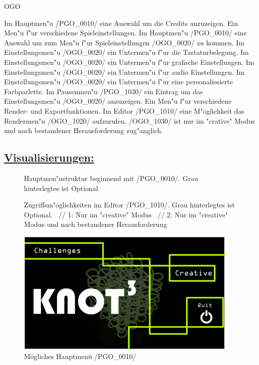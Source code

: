 \begin{ids}{\gls{OGO}}

	\id[0010] Im Hauptmen{"u} /PGO_0010/ eine Auswahl um die Credits anzuzeigen.
	\id[0020] Ein Men{"u} f{"u}r verschiedene Spieleinstellungen.
	\id[0030] Im Hauptmen{"u} /PGO_0010/ eine Auswahl um zum Men{"u} f{"u}r Spieleinstellungen /OGO_0020/ zu kommen.
	\id[0040] Im Einstellungsmen{"u} /OGO_0020/ ein Untermen{"u} f{"u}r die Tastaturbelegung.
	\id[0050] Im Einstellungsmen{"u} /OGO_0020/ ein Untermen{"u} f{"u}r grafische Einstellungen.
	\id[0060] Im Einstellungsmen{"u} /OGO_0020/ ein Untermen{"u} f{"u}r audio Einstellungen.
	\id[0070] Im Einstellungsmen{"u} /OGO_0020/ ein Untermen{"u} f{"u}r eine personaliesierte Farbparlette.
	\id[1010] Im Pausenmen{"u} /PGO_1030/ ein Eintrag um das Einstellungsmen{"u} /OGO_0020/ anzuzeigen.
	\id[1020] Ein Men{"u} f{"u}r verschiedene Render- und Exportfunktionen.
	\id[1030] Im Editor /PGO_1010/ eine M{"o}glichkeit das Rendermen{"u} /OGO_1020/ aufzurufen.
	\id[1040] /OGO_1030/ ist nur im "crative" Modus und nach bestandener Herausforderung zug{"a}nglich.
\end{ids}

\subsection*{\underline{Visualisierungen:}}
	\begin{figure}[h]
		\centering
	 	
	 	\caption{Hauptmen{"u}struktur beginnend mit /PGO_0010/. Grau hinterlegtes ist Optional.}
	\end{figure}

	\begin{figure}[h]
		\centering
	 	
	 	\caption{Zugriffsm{"o}glichkeiten im Editor /PGO_1010/. Grau hinterlegtes ist Optional. ~//
			1: Nur im "creative" Modus ~//
			2: Nur im "creative" Modus und nach bestandener Herausforderung}
	\end{figure}
	
	\begin{figure}[ht]
	  \centering
	  \includegraphics[width = 0.95\textwidth]{Grafiken/Grafische_Oberflaechen/01_Knot3-mainscreen.png}
	  \caption{Mögliches Hauptmenü /PGO_0010/}
	\end{figure}

